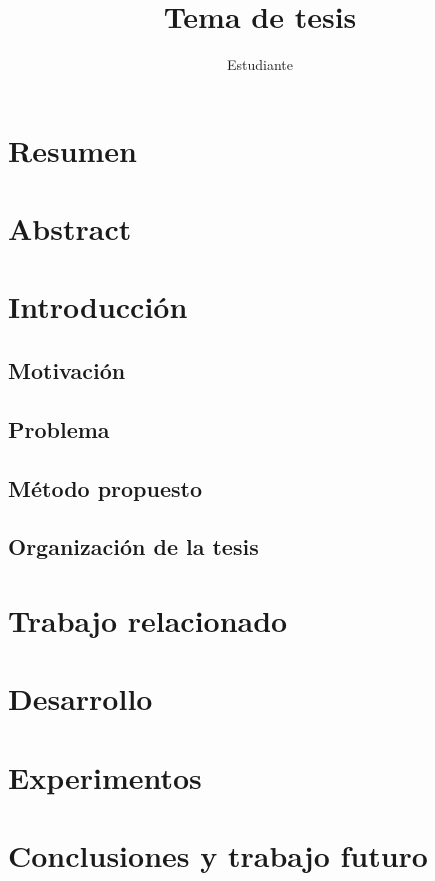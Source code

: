 \documentclass[12pt, letterpaper]{book}
\title{Tema de tesis}
\author{Estudiante}
\begin{document}
	\renewcommand{\listtablename}{{Índice de tablas}}
	\renewcommand{\tablename}{Tabla}
	


\newpage\null\thispagestyle{empty}\newpage
	
\chapter*{Resumen}


\chapter*{Abstract}


\newpage\null\thispagestyle{empty}\newpage

\tableofcontents

\chapter{Introducción}
\section{Motivación}
\section{Problema}
\section{Método propuesto}
\section{Organización de la tesis}

\chapter{Trabajo relacionado}

\chapter{Desarrollo}

\chapter{Experimentos}

\chapter{Conclusiones y trabajo futuro}
\end{document}
